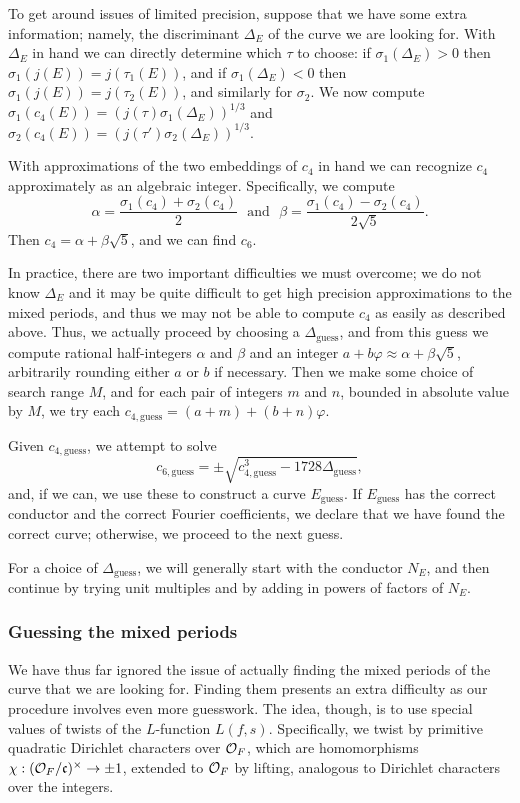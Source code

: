\documentclass{amsart}
\newcommand{\fc}{\mathfrak{c}}
\newcommand{\OF}{\cO_F}
\begin{document}
To get around issues of limited precision, suppose that we have some extra information; 
namely, the discriminant $\Delta_E$ of the curve we are looking for.  With $\Delta_E$ in
hand we can directly determine which $\tau$ to choose: if $\sigma_1(\Delta_E) > 0$ then
$\sigma_1(j(E)) = j(\tau_1(E))$, and if $\sigma_1(\Delta_E) < 0$ then $\sigma_1(j(E)) = j(\tau_2(E))$,
and similarly for $\sigma_2$. We now compute $\sigma_1(c_4(E)) = (j(\tau) \sigma_1(\Delta_E))^{1/3}$
and $\sigma_2(c_4(E)) = (j(\tau') \sigma_2(\Delta_E))^{1/3}$.

With approximations of the two embeddings of $c_4$ in hand we can recognize $c_4$ approximately
as an algebraic integer. Specifically, we compute
\[
    \alpha = \frac{\sigma_1(c_4) + \sigma_2(c_4)}{2}\ \ \  \text{and} \ \ \ 
    \beta = \frac{\sigma_1(c_4) - \sigma_2(c_4)}{2\sqrt{5}}.
\]
Then $c_4 = \alpha + \beta\sqrt{5}$, and we can find $c_6$.

\newcommand{\Deltaguess}{\Delta_{\textrm{guess}}}
\newcommand{\cfourguess}{c_{4,\textrm{guess}}}
\newcommand{\csixguess}{c_{6,\textrm{guess}}}
\newcommand{\Eguess}{E_\textrm{guess}}

In practice, there are two important difficulties we must overcome; we do not know
$\Delta_E$ and it may be quite difficult to get high precision approximations to the
mixed periods, and thus we may not be able to compute $c_4$ as easily as described
above. Thus, we actually proceed by choosing a $\Deltaguess$, and from this guess we
compute rational half-integers $\alpha$ and $\beta$ and an integer
$a + b\varphi \approx \alpha + \beta\sqrt5$, arbitrarily rounding either $a$ or $b$ if necessary.
Then we make some choice of search range $M$, and for each pair of integers $m$ and $n$,
bounded in absolute value by $M$, we try each $\cfourguess = (a + m) + (b + n)\varphi$.

Given $\cfourguess$, we attempt to solve
\[
    \csixguess = \pm \sqrt{ \cfourguess^3 - 1728 \Deltaguess },
\]
and, if we can, we use these to construct a curve $\Eguess$. If $\Eguess$ has
the correct conductor and the correct Fourier coefficients, we declare that
we have found the correct curve; otherwise, we proceed to the next guess.

For a choice of $\Deltaguess$, we will generally start with the conductor $N_E$,
and then continue by trying unit multiples and by adding in powers of factors of $N_E$.

\subsubsection{Guessing the mixed periods}
We have thus far ignored the issue of actually finding the mixed periods of the curve that
we are looking for. Finding them presents an extra difficulty as our procedure involves
even more guesswork. The idea, though, is to use special values of twists of the $L$-function
$L(f, s)$. Specifically, we twist by primitive quadratic Dirichlet characters over $\OF$,
which are homomorphisms $\chi : (\OF/\fc)^\times \rightarrow \pm1$, extended to $\OF$ by
lifting, analogous to Dirichlet characters over the integers.
\end{document}
